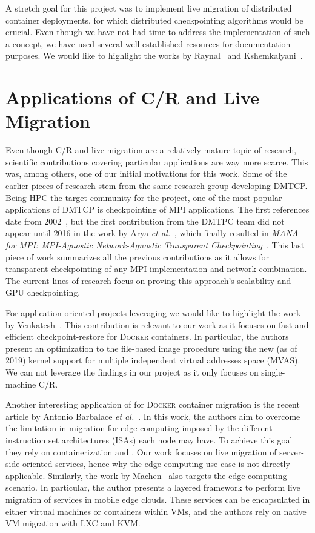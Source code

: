 A stretch goal for this project was to implement live migration of distributed container deployments, for which distributed checkpointing algorithms would be crucial.
Even though we have not had time to address the implementation of such a concept, we have used several well-established resources for documentation purposes.
We would like to highlight the works by Raynal~\cite{Raynal2013} and Kshemkalyani~\cite{Kshemkalyani2008}.

\section{Applications of C/R and Live Migration} \label{sec:rw-app}

Even though C/R and live migration are a relatively mature topic of research, scientific contributions covering particular applications are way more scarce.
This was, among others, one of our initial motivations for this work.
Some of the earlier pieces of research stem from the same research group developing DMTCP.
Being HPC the target community for the project, one of the most popular applications of DMTCP is checkpointing of MPI applications.
The first references date from 2002~\cite{Bosilca2002}, but the first contribution from the DMTPC team did not appear until 2016 in the work by Arya \textit{et al.}~\cite{Arya2016}, which finally resulted in \textit{MANA for MPI: MPI-Agnostic Network-Agnostic Transparent Checkpointing}~\cite{Garg2019}.
This last piece of work summarizes all the previous contributions as it allows for transparent checkpointing of any MPI implementation and network combination.
The current lines of research focus on proving this approach's scalability and GPU checkpointing.

For application-oriented projects leveraging \criu we would like to highlight the work by Venkatesh~\cite{Venkatesh2019}.
This contribution is relevant to our work as it focuses on fast and efficient checkpoint-restore for \textsc{Docker} containers.
In particular, the authors present an optimization to the file-based image procedure using the new (as of 2019) kernel support for multiple independent virtual addresses space (MVAS).
We can not leverage the findings in our project as it only focuses on single-machine C/R.

Another interesting application of \criu for \textsc{Docker} container migration is the recent article by Antonio Barbalace \textit{et al.}~\cite{Barbalace2020}.
In this work, the authors aim to overcome the limitation in migration for edge computing imposed by the different instruction set architectures (ISAs) each node may have.
To achieve this goal they rely on containerization and \criu.
Our work focuses on live migration of server-side oriented services, hence why the edge computing use case is not directly applicable.
Similarly, the work by Machen~\cite{Machen2018} also targets the edge computing scenario.
In particular, the author presents a layered framework to perform live migration of services in mobile edge clouds.
These services can be encapsulated in either virtual machines or containers within VMs, and the authors rely on native VM migration with LXC and KVM.

